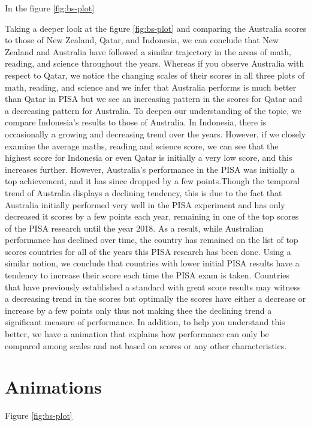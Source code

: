 In the figure \ref{fig:bs-plot}

Taking a deeper look at the figure \ref{fig:bs-plot} and comparing the
Australia scores to those of New Zealand, Qatar, and Indonesia, we can
conclude that New Zealand and Australia have followed a similar
trajectory in the areas of math, reading, and science throughout the
years. Whereas if you observe Australia with respect to Qatar, we notice
the changing scales of their scores in all three plots of math, reading,
and science and we infer that Australia performs is much better than
Qatar in PISA but we see an increasing pattern in the scores for Qatar
and a decreasing pattern for Australia. To deepen our understanding of
the topic, we compare Indonesia's results to those of Australia. In
Indonesia, there is occasionally a growing and decreasing trend over the
years. However, if we closely examine the average maths, reading and
science score, we can see that the highest score for Indonesia or even
Qatar is initially a very low score, and this increases further.
However, Australia's performance in the PISA was initially a top
achievement, and it has since dropped by a few points.Though the
temporal trend of Australia displays a declining tendency, this is due
to the fact that Australia initially performed very well in the PISA
experiment and has only decreased it scores by a few points each year,
remaining in one of the top scores of the PISA research until the year
2018. As a result, while Australian performance has declined over time,
the country has remained on the list of top scores countries for all of
the years this PISA research has been done. Using a similar notion, we
conclude that countries with lower initial PISA results have a tendency
to increase their score each time the PISA exam is taken. Countries that
have previously established a standard with great score results may
witness a decreasing trend in the scores but optimally the scores have
either a decrease or increase by a few points only thus not making thee
the declining trend a significant measure of performance. In addition,
to help you understand this better, we have a animation that explains
how performance can only be compared among scales and not based on
scores or any other characteristics.

\hypertarget{animations}{%
\section{Animations}\label{animations}}

Figure \ref{fig:bs-plot}

